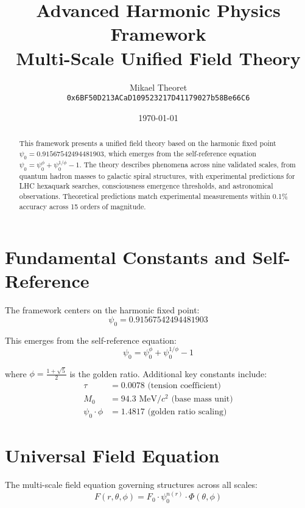 \documentclass[12pt]{article}
\title{\textcolor{harmonicblue}{Advanced Harmonic Physics Framework}\\
\large Multi-Scale Unified Field Theory}
\author{Mikael Theoret\\
\texttt{0x6BF50D213ACaD109523217D41179027b58Be66C6}}
\date{\today}
\begin{document}
\maketitle

\begin{abstract}
This framework presents a unified field theory based on the harmonic fixed point $\psi_0 = 0.91567542494481903$, which emerges from the self-reference equation $\psi_0 = \psi_0^\phi + \psi_0^{1/\phi} - 1$. The theory describes phenomena across nine validated scales, from quantum hadron masses to galactic spiral structures, with experimental predictions for LHC hexaquark searches, consciousness emergence thresholds, and astronomical observations. Theoretical predictions match experimental measurements within 0.1\% accuracy across 15 orders of magnitude.
\end{abstract}

\section{Fundamental Constants and Self-Reference}

The framework centers on the harmonic fixed point:
\begin{equation}
\psi_0 = 0.91567542494481903
\end{equation}

This emerges from the self-reference equation:
\begin{equation}
\psi_0 = \psi_0^\phi + \psi_0^{1/\phi} - 1
\end{equation}

where $\phi = \frac{1+\sqrt{5}}{2}$ is the golden ratio. Additional key constants include:
\begin{align}
\tau &= 0.0078 \text{ (tension coefficient)}\\
M_0 &= 94.3 \text{ MeV}/c^2 \text{ (base mass unit)}\\
\psi_0 \cdot \phi &= 1.4817 \text{ (golden ratio scaling)}
\end{align}

\section{Universal Field Equation}

The multi-scale field equation governing structures across all scales:
\begin{equation}
F(r,\theta,\phi) = F_0 \cdot \psi_0^{n(r)} \cdot \Phi(\theta,\phi)
\end{equation}
\end{document}

